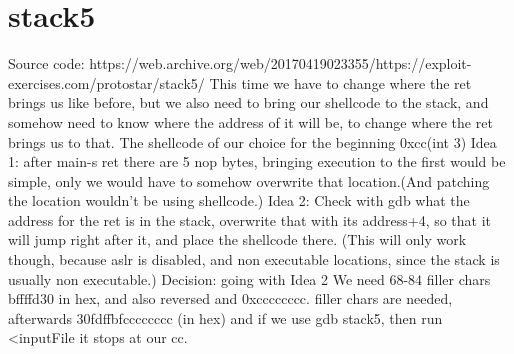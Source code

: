\documentclass[11pt,a4paper]{article}
\begin{document}
\section*{stack5}
\markright{}
Source code:\newline
https://web.archive.org/web/20170419023355/https://exploit-exercises.com/protostar/stack5/\newline
This time we have to change where the ret brings us like before, but we also need to bring our shellcode to the stack, and somehow need to know where the address of it will be, to change where the ret brings us to that.\newline
The shellcode of our choice for the beginning 0xcc(int 3)\newline
Idea 1: after main-s ret there are 5 nop bytes, bringing execution to the first would be simple, only we would have to somehow overwrite that location.(And patching the location wouldn't be using shellcode.)
Idea 2: Check with gdb what the address for the ret is in the stack, overwrite that with its address+4, so that it will jump right after it, and place the shellcode there.\newline
(This will only work though, because aslr is disabled, and non executable locations, since the stack is usually non executable.)\newline
Decision: going with Idea 2\newline
We need 68-84 filler chars bffffd30 in hex, and also reversed and 0xcccccccc. filler chars are needed, afterwards 30fdffbfcccccccc (in hex) and if we use gdb stack5, then run <inputFile it stops at our cc.
\end{document}
